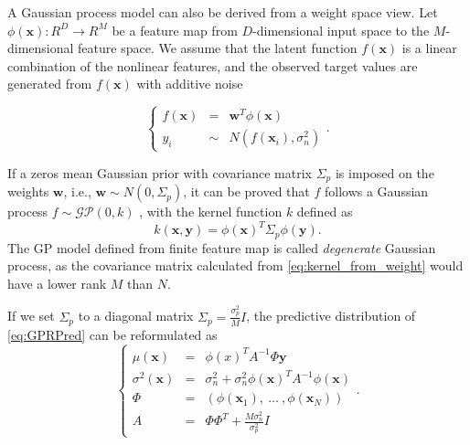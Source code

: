 A Gaussian process model can also be derived from a weight space view. Let $\phi(\bm{x}): R^D \rightarrow R^M$ be a feature map from $D$-dimensional input space to the $M$-dimensional feature space. We assume that the latent function $f(\bm{x})$ is a linear combination of the nonlinear features, and the observed target values are generated from $f(\bm{x})$ with additive noise

\begin{equation}
    \label{eq:weightspace}
    \left\{
    \begin{array}{lll}
        f(\bm{x}) &=&    \bm{w}^T \phi(\bm{x})   \\
        y_i       &\sim& N(f(\bm{x}_i), \sigma_n^2)
    \end{array}.
    \right.
\end{equation}

If a zeros mean Gaussian prior with covariance matrix $\Sigma_p$ is imposed on the weights $\bm{w}$, i.e., $\bm{w} \sim N(0, \Sigma_p)$, it can be proved that $f$ follows a Gaussian process $f \sim \mathcal{GP}(0, k)$ \cite{GPML}, with the kernel function $k$ defined as
\begin{equation}
    \label{eq:kernel_from_weight}
    k(\bm{x}, \bm{y}) = \phi(\bm{x})^T \Sigma_p \phi(\bm{y}).
\end{equation}
The GP model defined from finite feature map is called \emph{degenerate} Gaussian process, as the covariance matrix calculated from \eqref{eq:kernel_from_weight} would have a lower rank $M$ than $N$.


If we set $\Sigma_p$ to a diagonal matrix $\Sigma_p = \frac{\sigma_p^2}{M} I$, the predictive distribution of \eqref{eq:GPRPred} can be reformulated as\cite{GPML,lazaro2010marginalized}
\begin{equation}
    \left\{
        \begin{array}{lll}
            \mu(\bm{x})      &= & \phi(x)^T A^{-1} \Phi \bm{y} \\
            \sigma^2(\bm{x}) &= & \sigma_n^2 + \sigma_n^2 \phi(\bm{x})^T A^{-1} \phi(\bm{x}) \\
            \Phi             &= & (\phi(\bm{x}_1),~\dots~,\phi(\bm{x}_N)) \\
            A                &= & \Phi \Phi^T + \frac{M \sigma_n^2}{\sigma_p^2} I
        \end{array}.
    \right.
    \label{eq:DegeneratePred}
\end{equation}

